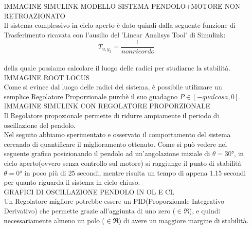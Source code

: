 IMMAGINE SIMULINK MODELLO SISTEMA PENDOLO+MOTORE NON RETROAZIONATO\\
Il sistema complessivo in ciclo aperto è dato quindi dalla seguente funzione di Trasferimento ricavata con l'ausilio del 'Linear Analisys Tool' di Simulink:\\
$$T_{u,y_2}=\displaystyle\frac{1}{non ricordo}$$\\
della quale possiamo calcolare il luogo delle radici per studiarne la stabilità.
IMMAGINE ROOT LOCUS\\
Come si evince dal luogo delle radici del sistema, è possibile utilizzare un semplice Regolatore Proporzionale purchè il suo guadagno $P\in[-qualcosa,0]$.\\
IMMAGINE SIMULINK CON REGOLATORE PROPORZIONALE\\
Il Regolatore propozionale permette di ridurre ampiamente il periodo di oscillazione del pendolo.\\
Nel seguito abbiamo sperimentato e osservato il comportamento del sistema cercando di quantificare il miglioramento ottenuto. 
Come si può vedere nel seguente grafico posizionando il pendolo ad un'angolazione iniziale di $\theta=\ang{30}$, in ciclo aperto(ovvero senza controllo sul motore) si raggiunge il punto di stabilità $\theta=\ang{0}$ in poco più di 25 secondi, mentre risulta un tempo di appena 1.15 secondi per quanto riguarda il sistema in ciclo chiuso.\\
GRAFICI DI OSCILLAZIONE PENDOLO IN OL E CL\\
Un Regolatore migliore potrebbe essere un PID(Proporzionale Integrativo Derivativo) che permette grazie all'aggiunta di uno zero ($\in\Re$), e quindi necessariamente almeno un polo ($\in\Re$) di avere un maggiore margine di stabilità.\\\\
